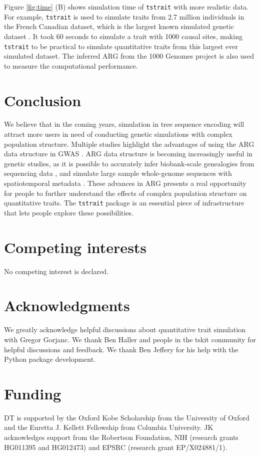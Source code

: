 \documentclass[unnumsec,webpdf,modern,large,namedate]{oup-authoring-template}%
\begin{document}
Figure \ref{fig:time} (B) shows simulation time of \texttt{tstrait} with more
realistic data. For example, \texttt{tstrait} is used to simulate traits from
2.7 million individuals in the French Canadian dataset, which is the largest
known simulated genetic dataset \citep{anderson2023}. It took 60 seconds to
simulate a trait with 1000 causal sites, making \texttt{tstrait} to be
practical to simulate quantitative traits from this largest ever simulated
dataset. The inferred ARG from the 1000 Genomes project \citep{kelleher2019} is
also used to measure the computational performance.


\section{Conclusion}

We believe that in the coming years, simulation in tree sequence encoding will
attract more users in need of conducting genetic simulations with complex
population structure. Multiple studies highlight the advantages of using the
ARG data structure in GWAS \citep{link2023tree,nowbandegani2023extremely,zhang2023}.
ARG data
structure is becoming increasingly useful in genetic studies, as it is possible
to accurately infer biobank-scale genealogies from sequencing data
\citep{zhang2023}, and simulate large sample whole-genome sequences with
spatiotemporal metadata \citep{anderson2023}. These advances in ARG presents a
real opportunity for people to further understand the effects of complex
population structure on quantitative traits. The \texttt{tstrait} package is an
essential piece of infrastructure that lets people explore these possibilities.

\section{Competing interests}
No competing interest is declared.

\section{Acknowledgments}

We greatly acknowledge helpful discussions about quantitative trait simulation
with Gregor Gorjanc. We thank Ben Haller and people in the tskit community for
helpful discussions and feedback. We thank Ben Jeffery for his help with the
Python package development.

\section{Funding}
DT is supported by the Oxford Kobe Scholarship from the University of Oxford
and the Euretta J. Kellett Fellowship from Columbia University.
JK acknowledges support from the Robertson Foundation,
NIH (research grants HG011395 and HG012473) and
EPSRC (research grant EP/X024881/1).
\end{document}
